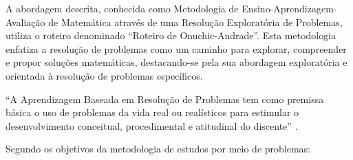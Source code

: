A abordagem descrita, conhecida como Metodologia de Ensino-Aprendizagem-Avaliação de Matemática através de uma Resolução Exploratória de Problemas, utiliza o roteiro denominado ``Roteiro de Onuchic-Andrade''. Esta metodologia enfatiza a resolução de problemas como um caminho para explorar, compreender e propor soluções matemáticas, destacando-se pela sua abordagem exploratória e orientada à resolução de problemas específicos.

``A Aprendizagem Baseada em Resolução de Problemas tem como premissa básica o uso de problemas da vida real ou realísticos para estimular o desenvolvimento conceitual, procedimental e atitudinal do discente'' .


Segundo  os objetivos da metodologia de estudos por meio de problemas:

